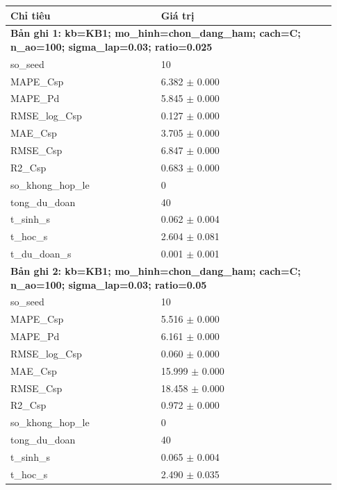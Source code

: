 \begin{longtable}{p{0.43\linewidth}p{0.50\linewidth}}
\toprule Chỉ tiêu & Giá trị \\ \midrule \endhead
\multicolumn{2}{p{0.95\linewidth}}{\textbf{Bản ghi 1: kb=KB1; mo\_hinh=chon\_dang\_ham; cach=C; n\_ao=100; sigma\_lap=0.03; ratio=0.025}} \\
so\_\allowbreak seed & 10 \\
MAPE\_\allowbreak Csp & 6.382 $\pm$ 0.000 \\
MAPE\_\allowbreak Pd & 5.845 $\pm$ 0.000 \\
RMSE\_\allowbreak log\_\allowbreak Csp & 0.127 $\pm$ 0.000 \\
MAE\_\allowbreak Csp & 3.705 $\pm$ 0.000 \\
RMSE\_\allowbreak Csp & 6.847 $\pm$ 0.000 \\
R2\_\allowbreak Csp & 0.683 $\pm$ 0.000 \\
so\_\allowbreak khong\_\allowbreak hop\_\allowbreak le & 0 \\
tong\_\allowbreak du\_\allowbreak doan & 40 \\
t\_\allowbreak sinh\_\allowbreak s & 0.062 $\pm$ 0.004 \\
t\_\allowbreak hoc\_\allowbreak s & 2.604 $\pm$ 0.081 \\
t\_\allowbreak du\_\allowbreak doan\_\allowbreak s & 0.001 $\pm$ 0.001 \\
\midrule
\multicolumn{2}{p{0.95\linewidth}}{\textbf{Bản ghi 2: kb=KB1; mo\_hinh=chon\_dang\_ham; cach=C; n\_ao=100; sigma\_lap=0.03; ratio=0.05}} \\
so\_\allowbreak seed & 10 \\
MAPE\_\allowbreak Csp & 5.516 $\pm$ 0.000 \\
MAPE\_\allowbreak Pd & 6.161 $\pm$ 0.000 \\
RMSE\_\allowbreak log\_\allowbreak Csp & 0.060 $\pm$ 0.000 \\
MAE\_\allowbreak Csp & 15.999 $\pm$ 0.000 \\
RMSE\_\allowbreak Csp & 18.458 $\pm$ 0.000 \\
R2\_\allowbreak Csp & 0.972 $\pm$ 0.000 \\
so\_\allowbreak khong\_\allowbreak hop\_\allowbreak le & 0 \\
tong\_\allowbreak du\_\allowbreak doan & 40 \\
t\_\allowbreak sinh\_\allowbreak s & 0.065 $\pm$ 0.004 \\
t\_\allowbreak hoc\_\allowbreak s & 2.490 $\pm$ 0.035 \\

\end{longtable}
